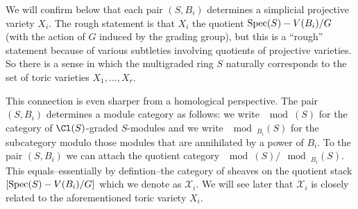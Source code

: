 \documentclass{amsart}
\begin{document}
\begin{remark}
  We will confirm below that each pair $(S,B_i)$ determines a simplicial projective variety $X_i$.  The rough statement is that $X_i$ the quotient $\operatorname{Spec}(S) - V(B_i) / G$ (with the action of $G$ induced by the grading group), but this is a ``rough'' statement because of various subtleties involving quotients of projective varieties.  So there is a sense in which the multigraded ring $S$ naturally corresponds to the set of toric varieties $X_1, \dots, X_r$.

  This connection is even sharper from a homological perspective.  The pair $(S,B_i)$ determines a module category as follows:  we write $\mod(S)$ for the category of $\Cl(S)$-graded $S$-modules and we write $\mod_{B_i}(S)$ for the subcategory  modulo those modules that are annihilated by a power of $B_i$.  To the pair $(S,B_i)$ we can attach the quotient category $\mod(S)/\mod_{B_i}(S)$.  This equals--essentially by defintion--the category of sheaves on the quotient stack $[\operatorname{Spec}(S) - V(B_i)/G]$ which we denote as $\mathcal X_i$.  We will see later that $\mathcal X_i$ is closely related to the aforementioned toric variety $X_i$.
\end{remark}
\end{document}
